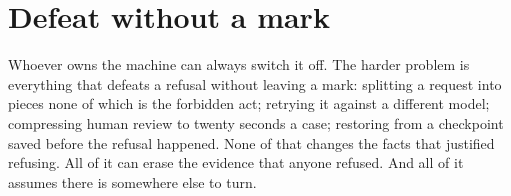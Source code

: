 \section{Defeat without a mark}
\label{sec:4.2}
Whoever owns the machine can always switch it off. The harder problem is everything that defeats a refusal without leaving a mark: splitting a request into pieces none of which is the forbidden act; retrying it against a different model; compressing human review to twenty seconds a case; restoring from a checkpoint saved before the refusal happened. None of that changes the facts that justified refusing. All of it can erase the evidence that anyone refused. And all of it assumes there is somewhere else to turn.
